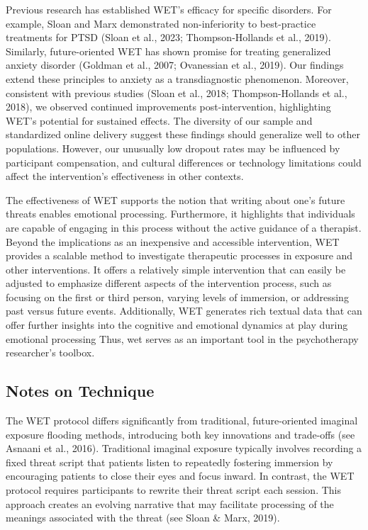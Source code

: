 \documentclass[
  man,floatsintext]{apa7}
\begin{document}
Previous research has established WET's efficacy for specific disorders.
For example, Sloan and Marx demonstrated non-inferiority to best-practice treatments for PTSD (Sloan et al., 2023; Thompson-Hollands et al., 2019).
Similarly, future-oriented WET has shown promise for treating generalized anxiety disorder (Goldman et al., 2007; Ovanessian et al., 2019).
Our findings extend these principles to anxiety as a transdiagnostic phenomenon.
Moreover, consistent with previous studies (Sloan et al., 2018; Thompson-Hollands et al., 2018), we observed continued improvements post-intervention, highlighting WET's potential for sustained effects.
The diversity of our sample and standardized online delivery suggest these findings should generalize well to other populations.
However, our unusually low dropout rates may be influenced by participant compensation, and cultural differences or technology limitations could affect the intervention's effectiveness in other contexts.

The effectiveness of WET supports the notion that writing about one's future threats enables emotional processing.
Furthermore, it highlights that individuals are capable of engaging in this process without the active guidance of a therapist.
Beyond the implications as an inexpensive and accessible intervention, WET provides a scalable method to investigate therapeutic processes in exposure and other interventions.
It offers a relatively simple intervention that can easily be adjusted to emphasize different aspects of the intervention process, such as focusing on the first or third person, varying levels of immersion, or addressing past versus future events.
Additionally, WET generates rich textual data that can offer further insights into the cognitive and emotional dynamics at play during emotional processing
Thus, wet serves as an important tool in the psychotherapy researcher's toolbox.

\subsection{Notes on Technique}\label{notes-on-technique}

The WET protocol differs significantly from traditional, future-oriented imaginal exposure flooding methods, introducing both key innovations and trade-offs (see Asnaani et al., 2016).
Traditional imaginal exposure typically involves recording a fixed threat script that patients listen to repeatedly fostering immersion by encouraging patients to close their eyes and focus inward.
In contrast, the WET protocol requires participants to rewrite their threat script each session.
This approach creates an evolving narrative that may facilitate processing of the meanings associated with the threat (see Sloan \& Marx, 2019).
\end{document}
